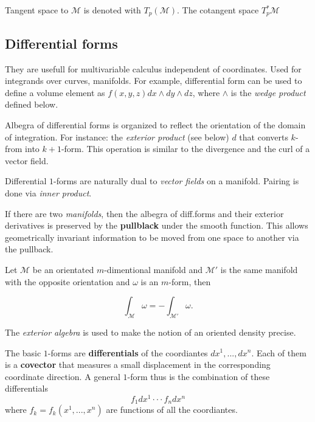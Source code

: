 Tangent space to $\mathcal{M}$ is denoted with $T_p(\mathcal{M})$.
The cotangent space $T_p ^* \mathcal{M}$


\subsection{Differential forms}

They are usefull for multivariable calculus independent of coordinates. Used for integrands over curves, manifolds. For example, differential form can be used to define a volume element as $f(x,y,z)dx \wedge dy \wedge dz$, where $\wedge$ is the \textit{wedge product} defined below.

Albegra of differential forms is organized to reflect the orientation of the domain of integration. For instance: the \textit{exterior product} (see below) $d$ that converts $k$-from into $k+1$-form. 
This operation is similar to the divergence and the curl of a vector field.

Differential $1$-forms are naturally dual to \textit{vector fields} on a manifold. Pairing is done via \textit{inner product}.

If there are two \textit{manifolds}, then the albegra of diff.forms and their exterior derivatives is preserved by the \textbf{pullblack} under the smooth function. 
This allows geometrically invariant information to be moved from one space to another via the pullback.

Let $\mathcal{M}$ be an orientated $m$-dimentional manifold and $\mathcal{M}'$ is the same manifold with the opposite orientation and $\omega$ is an $m$-form, then 

\begin{equation}
\int_{\mathcal{M}}\omega = -\int_{\mathcal{M}'}\omega.
\end{equation}

The \textit{exterior algebra} is used to make the notion of an oriented density precise.

The basic $1$-forms are \textbf{differentials} of the coordiantes $dx^1,...,dx^n$. 
Each of them is a \textbf{covector} that measures a small displacement in the corresponding coordinate direction. A general $1$-form thus is the combination of these differentials 
\begin{equation}
f_1dx^1\cdot\cdot\cdot f_ndx^n
\end{equation}
where $f_k=f_k(x^1,...,x^n)$ are functions of all the coordiantes. 

